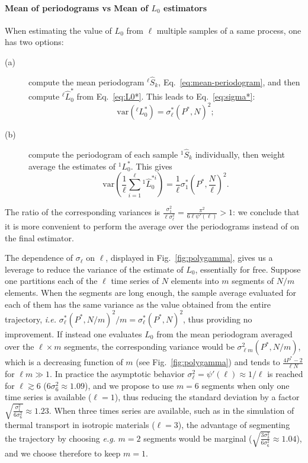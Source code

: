\begin{LEtext}
\paragraph{Mean of periodograms vs Mean of $L_0$ estimators}
When estimating the value of $L_{0}$ from $\ell$ multiple samples of a same process, one has two options:
\begin{description}
    \item[(a)] compute the mean periodogram ${^{\ell\!}}\hat{S}_k$, Eq.~\eqref{eq:mean-periodogram}, and then compute ${^{\ell\!}}\hat{L}_0^*$ from Eq.~\eqref{eq:L0*}. This leads to Eq.~\eqref{eq:sigma*}:
    \begin{equation}
        \textstyle
        \mathrm{var}\left( {^{\ell\!}}L_0^* \right) = \sigma^*_\ell \left(P^*,N\right)^2 ;
    \end{equation}
    \item[(b)] compute the periodogram of each sample ${^{1\!}}\hat{S}_k$ individually, then weight average the estimates of ${^{1\!}}L_0^*$. This gives
    \begin{equation}
        \textstyle
        \mathrm{var}\left( \frac{1}{\ell} \sum_{i=1}^\ell {^{1\!}}\hat{L}_0^{*i} \right) = \frac{1}{\ell} \sigma_1^* \left(P^*,\frac{N}{\ell}\right)^2 .
    \end{equation}
\end{description}
The ratio of the corresponding variances is $\frac{\sigma_{1}^{2}}{\ell\sigma_{\ell}^{2}} = \frac{\pi^2}{6\ell\psi'(\ell)} > 1$: we conclude that it is more convenient to perform the average over the periodograms instead of on the final estimator. 

The dependence of $\sigma_{\ell}$ on $\ell$, displayed in Fig.~\ref{fig:polygamma}, gives us a leverage to reduce the variance of the estimate of $L_{0}$, essentially for free. Suppose one partitions each of the $\ell$ time series of $N$ elements into $m$ segments of $N/m$ elements. When the segments are long enough, the sample average evaluated for each of them has the same variance as the value obtained from the entire trajectory, \emph{i.e.} $\sigma_\ell^{*}(P^{*},N/m)^{2}/m = \sigma_\ell^{*}(P^{*},N)^{2}$, thus providing no improvement. If instead one evaluates ${L}_{0}$ from the mean periodogram averaged over the $\ell \times m$ segments, the corresponding variance would be $\sigma_{\ell m}^2(P^*,N/m)$, which is a decreasing function of $m$ (see Fig.~\ref{fig:polygamma}) and tends to $\frac{4P^{*}-2}{\ell N}$ for $\ell m\gg 1$. In practice the asymptotic behavior $\sigma_{\ell}^{2} = \psi'(\ell) \approx 1/\ell$ is reached for $\ell \gtrsim 6$ ($6\sigma_{6}^{2}\approx 1.09$), and we propose to use $m=6$ segments when only one time series is available ($\ell=1$), thus reducing the standard deviation by a factor $\sqrt{\frac{\sigma_{1}^{2}}{6\sigma_{6}^{2}}}\approx 1.23$. When three times series are available, such as in the simulation of thermal transport in isotropic materials ($\ell=3$), the advantage of segmenting the trajectory by choosing \emph{e.g.} $m=2$ segments would be marginal ($\sqrt{\frac{3\sigma_{3}^{2}}{6\sigma_{6}^{2}}} \approx 1.04$), and we choose therefore to keep $m=1$. 
\end{LEtext}


